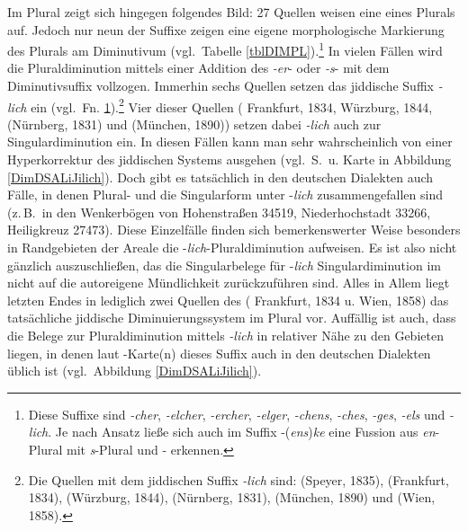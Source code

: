   
Im Plural zeigt sich hingegen folgendes Bild: 27 Quellen weisen eine  eines Plurals auf. Jedoch nur neun der Suffixe zeigen eine eigene morphologische Markierung des Plurals am Diminutivum (vgl.\, Tabelle \ref{tblDIMPL}).\footnote{\label{FNDIMPL}Diese Suffixe sind \textit{-cher}, \textit{-elcher}, \textit{-ercher}, \textit{-elger}, \textit{-chens}, \textit{-ches}, \textit{-ges}, \textit{-els} und \textit{-lich}. Je nach Ansatz ließe sich auch im Suffix -(\textit{ens})\textit{ke} eine Fussion aus \textit{en}-Plural mit \textit{s}-Plural und - erkennen.} In vielen Fällen wird die Pluraldiminution mittels einer Addition des  \textit{-er}- oder \textit{-s}- mit dem Diminutivsuffix vollzogen. Immerhin sechs Quellen setzen das jiddische Suffix \textit{-lich} ein (vgl.\, Fn. \ref{FNDIMPL}).\footnote{Die Quellen mit dem jiddischen Suffix \textit{-lich} sind:  (Speyer, 1835),  (Frankfurt, 1834),  (Würzburg, 1844),  (Nürnberg, 1831),  (München, 1890) und  (Wien, 1858).} Vier dieser Quellen ( Frankfurt, 1834,  Würzburg, 1844,  (Nürnberg, 1831) und  (München, 1890)) setzen dabei \textit{-lich} auch zur Singulardiminution ein. In diesen Fällen kann man sehr wahrscheinlich von einer Hyperkorrektur des jiddischen Systems ausgehen (vgl.\, S.\, \pageref{lichHyper} u. Karte in Abbildung \ref{DimDSALiJilich}). Doch gibt es tatsächlich in den deutschen Dialekten auch Fälle, in denen Plural- und die Singularform unter -\textit{lich} zusammengefallen sind (z.\,B.\, in den Wenkerbögen von Hohenstraßen 34519, Niederhochstadt 33266, Heiligkreuz 27473). Diese Einzelfälle finden sich bemerkenswerter Weise besonders in Randgebieten der Areale die -\textit{lich}-Pluraldiminution aufweisen. Es ist also nicht gänzlich auszuschließen, das die Singularbelege für -\textit{lich} Singulardiminution im  nicht auf die autoreigene Mündlichkeit zurückzuführen sind. Alles in Allem liegt letzten Endes in lediglich zwei Quellen des  ( Frankfurt, 1834 u.  Wien, 1858) das tatsächliche jiddische Diminuierungssystem im Plural vor. Auffällig ist auch, dass die Belege zur Pluraldiminution mittels \textit{-lich} in relativer Nähe zu den Gebieten liegen, in denen laut -Karte(n) dieses Suffix auch in den deutschen Dialekten üblich ist (vgl.\, Abbildung \ref{DimDSALiJilich}). \,%

